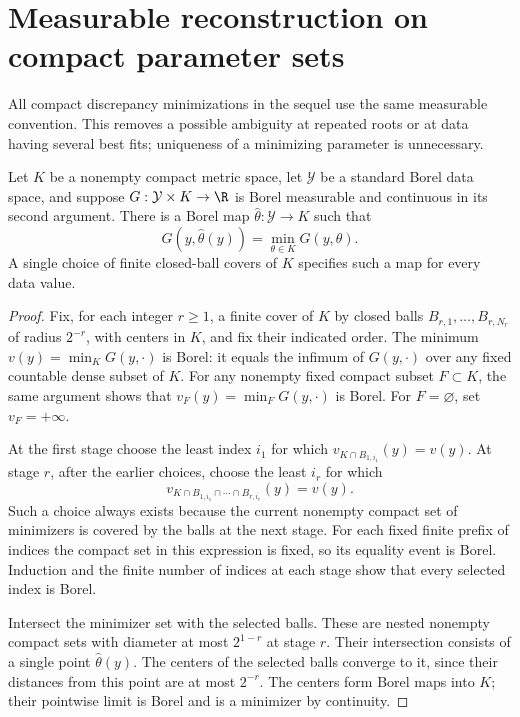 \section{Measurable reconstruction on compact parameter sets}
\label{sec:v7-selection}
All compact discrepancy minimizations in the sequel use the same
measurable convention. This removes a possible ambiguity at repeated
roots or at data having several best fits; uniqueness of a minimizing
parameter is unnecessary.

\begin{lemma}
\label{lem:v7-selection}
Let $K$ be a nonempty compact metric space, let $\mathcal Y$ be a
standard Borel data space, and suppose $G:\mathcal Y\times K\to\R$
is Borel measurable and continuous in its second argument. There is a
Borel map $\widehat\theta:\mathcal Y\to K$ such that
\[
 G(y,\widehat\theta(y))=\min_{\theta\in K}G(y,\theta).
\]
A single choice of finite closed-ball covers of $K$ specifies such a
map for every data value.
\end{lemma}
\begin{proof}
Fix, for each integer $r\ge1$, a finite cover of $K$ by closed balls
$B_{r,1},\ldots,B_{r,N_r}$ of radius $2^{-r}$, with centers in $K$,
and fix their indicated order. The minimum
$v(y)=\min_KG(y,\cdot)$ is Borel: it equals the infimum of $G(y,\cdot)$
over any fixed countable dense subset of $K$. For any nonempty fixed
compact subset $F\subset K$, the same argument shows that
$v_F(y)=\min_FG(y,\cdot)$ is Borel. For $F=\varnothing$, set
$v_F=+\infty$.

At the first stage choose the least index $i_1$ for which
$v_{K\cap B_{1,i_1}}(y)=v(y)$. At stage $r$, after the earlier choices,
choose the least $i_r$ for which
\[
 v_{K\cap B_{1,i_1}\cap\cdots\cap B_{r,i_r}}(y)=v(y).
\]
Such a choice always exists because the current nonempty compact set
of minimizers is covered by the balls at the next stage. For each
fixed finite prefix of indices the compact set in this expression is
fixed, so its equality event is Borel. Induction and the finite number
of indices at each stage show that every selected index is Borel.

Intersect the minimizer set with the selected balls. These are nested
nonempty compact sets with diameter at most $2^{1-r}$ at stage $r$.
Their intersection consists of a single point $\widehat\theta(y)$.
The centers of the selected balls converge to it, since their distances
from this point are at most $2^{-r}$. The centers form Borel maps into
$K$; their pointwise limit is Borel and is a minimizer by continuity.
\end{proof}

